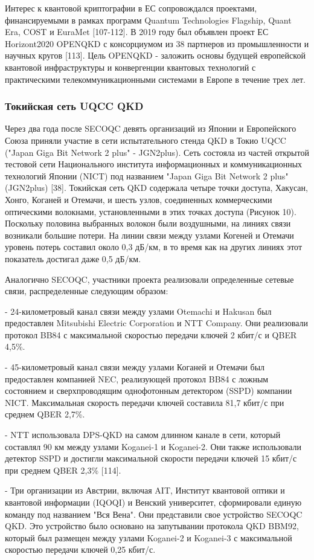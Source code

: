 Интерес к квантовой криптографии в ЕС сопровождался проектами, финансируемыми в рамках программ Quantum Technologies Flagship, Quant Era, COST и EuraMet [107-112]. В 2019 году был объявлен проект ЕС Horizont2020 OPENQKD с консорциумом из 38 партнеров из промышленности и научных кругов [113]. Цель OPENQKD - заложить основы будущей европейской квантовой инфраструктуры и конвергенции квантовых технологий с практическими телекоммуникационными системами в Европе в течение трех лет.
\subsubsection*{Токийская сеть UQCC QKD}
Через два года после SECOQC девять организаций из Японии и Европейского Союза приняли участие в сети испытательного стенда QKD в Токио UQCC ("Japan Giga Bit Network 2 plus" - JGN2plus). Сеть состояла из частей открытой тестовой сети Национального института информационных и коммуникационных технологий Японии (NICT) под названием "Japan Giga Bit Network 2 plus" (JGN2plus) [38].
Токийская сеть QKD содержала четыре точки доступа, Хакусан, Хонго, Коганей и Отемачи, и шесть узлов, соединенных коммерческими оптическими волокнами, установленными в этих точках доступа (Рисунок 10).
Поскольку половина выбранных волокон были воздушными, на линиях связи возникали большие потери. На линии связи между узлами Когеней и Отемачи уровень потерь составил около 0,3 дБ/км, в то время как на других линиях этот показатель достигал даже 0,5 дБ/км.

Аналогично SECOQC, участники проекта реализовали определенные сетевые связи, распределенные следующим образом:

- 24-километровый канал связи между узлами Otemachi и Hakusan был предоставлен Mitsubishi Electric Corporation и NTT Company. Они реализовали протокол BB84 с максимальной скоростью передачи ключей 2 кбит/с и QBER 4,5\%.

- 45-километровый канал связи между узлами Коганей и Отемачи был предоставлен компанией NEC, реализующей протокол BB84 с ложным состоянием и сверхпроводящим однофотонным детектором (SSPD) компании NICT. Максимальная скорость передачи ключей составила 81,7 кбит/с при среднем QBER 2,7\%.

- NTT использовала DPS-QKD на самом длинном канале в сети, который составлял 90 км между узлами Koganei-1 и Koganei-2. Они также использовали детектор SSPD и достигли максимальной скорости передачи ключей 15 кбит/с при среднем QBER 2,3\% [114].

- Три организации из Австрии, включая AIT, Институт квантовой оптики и квантовой информации (IQOQI) и Венский университет, сформировали единую команду под названием "Вся Вена". Они представили свое устройство SECOQC QKD. Это устройство было основано на запутывании протокола QKD BBM92, который был размещен между узлами Koganei-2 и Koganei-3 с максимальной скоростью передачи ключей 0,25 кбит/с.

